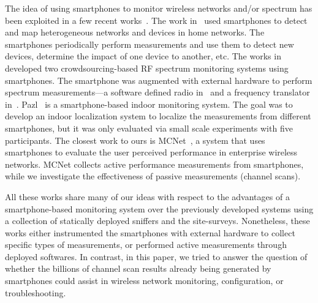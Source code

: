 The idea of using smartphones to monitor wireless networks and/or spectrum has
been exploited in a few recent
works~\cite{nychis:hotwireless2014,nika:hotwireless2014,zhang:hotmobile2015,shi2014crowdsourcing}.
The work in~\cite{nychis:hotwireless2014} used smartphones to detect and map
heterogeneous networks and devices in home networks. The smartphones
periodically perform measurements and use them to detect new devices, determine
the impact of one device to another, etc. The works
in~\cite{nika:hotwireless2014,zhang:hotmobile2015} developed two
crowdsourcing-based RF spectrum monitoring systems using smartphones. The
smartphone was augmented with external hardware to perform spectrum
measurements---a software defined radio in~\cite{nika:hotwireless2014} and a
frequency translator in~\cite{zhang:hotmobile2015}. Pazl~\cite{radu2013pazl} is
a smartphone-based indoor \wifi{} monitoring system. The goal was to develop an
indoor localization system to localize the measurements from different
smartphones, but it was only evaluated via small scale experiments with five 
participants. The closest work to ours is MCNet~\cite{rosen2014mcnet}, a system
that uses smartphones to evaluate the user perceived performance in enterprise
wireless networks. MCNet collects active performance measurements from
smartphones, while we investigate the effectiveness of passive measurements
(channel scans).

All these works share many of our ideas with respect to the advantages of a
smartphone-based monitoring system over the previously developed systems using a
collection of statically deployed sniffers and the site-surveys. Nonetheless,
these works either instrumented the smartphones with external
hardware to collect specific types of measurements, or performed active
measurements through deployed softwares. In contrast, in this paper, we tried to
answer the question of whether the billions of \wifi{} channel scan results
already being generated by smartphones could assist in wireless network monitoring,
configuration, or troubleshooting.
